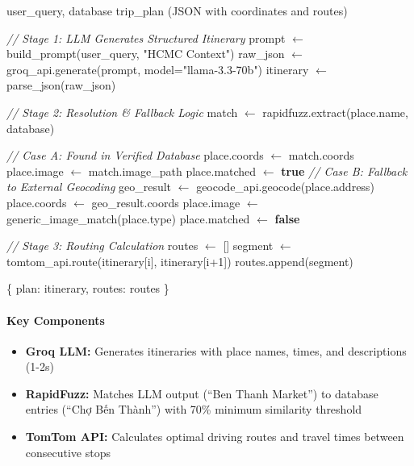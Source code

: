 \begin{algorithm}[H]
\caption{AI Trip Planning}
\begin{algorithmic}[1]
\REQUIRE user\_query, database
\ENSURE trip\_plan (JSON with coordinates and routes)

\STATE \textit{// Stage 1: LLM Generates Structured Itinerary}
\STATE prompt $\gets$ build\_prompt(user\_query, "HCMC Context")
\STATE raw\_json $\gets$ groq\_api.generate(prompt, model="llama-3.3-70b")
\STATE itinerary $\gets$  parse\_json(raw\_json)

\STATE \textit{// Stage 2: Resolution \& Fallback Logic}
    \STATE match $\gets$ rapidfuzz.extract(place.name, database)
    
        \STATE \textit{// Case A: Found in Verified Database}
        \STATE place.coords $\gets$ match.coords
        \STATE place.image $\gets$ match.image\_path
        \STATE place.matched $\gets$ \textbf{true}
    \ELSE
        \STATE \textit{// Case B: Fallback to External Geocoding}
        \STATE geo\_result $\gets$ geocode\_api.geocode(place.address)
            \STATE place.coords $\gets$ geo\_result.coords
        \ENDIF
        \STATE place.image $\gets$ generic\_image\_match(place.type)
        \STATE place.matched $\gets$ \textbf{false}
    \ENDIF
\ENDFOR

\STATE \textit{// Stage 3: Routing Calculation}
\STATE routes $\gets$ []
        \STATE segment $\gets$ tomtom\_api.route(itinerary[i], itinerary[i+1])
        \STATE routes.append(segment)
    \ENDIF
\ENDFOR

\RETURN \{ plan: itinerary, routes: routes \}
\end{algorithmic}
\end{algorithm}

\paragraph{Key Components}
\begin{itemize}[noitemsep]
    \item \textbf{Groq LLM:} Generates itineraries with place names, times, and descriptions (1-2s)
    \item \textbf{RapidFuzz:} Matches LLM output (``Ben Thanh Market'') to database entries (``Chợ Bến Thành'') with 70\% minimum similarity threshold
    \item \textbf{TomTom API:} Calculates optimal driving routes and travel times between consecutive stops
\end{itemize}

